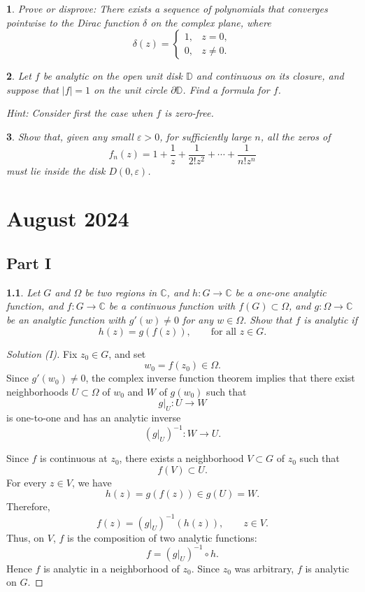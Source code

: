 \documentclass[12pt, a4paper]{report}
\theoremstyle{spaced}
\newtheorem{exercise}{}
\begin{document}
\begin{exercise}
	Prove or disprove: There exists a sequence of polynomials that converges
	pointwise to the Dirac function \(\delta\) on the complex plane, where
	\[
		\delta(z)=
		\begin{cases}
			1, & z=0,     \\
			0, & z\neq 0.
		\end{cases}
	\]
\end{exercise}

\begin{exercise}
	Let \(f\) be analytic on the open unit disk \(\mathbb{D}\) and continuous on
	its closure, and suppose that \(|f|=1\) on the unit circle
	\(\partial\mathbb{D}\). Find a formula for \(f\).

	\emph{Hint:} Consider first the case when \(f\) is zero-free.
\end{exercise}

\begin{exercise}
	Show that, given any small \(\varepsilon>0\), for sufficiently large \(n\),
	all the zeros of
	\[
		f_n(z)
		=
		1+\frac{1}{z}+\frac{1}{2!z^2}+\cdots+\frac{1}{n!z^n}
	\]
	must lie inside the disk \(D(0,\varepsilon)\).
\end{exercise}

\chapter{August 2024}

\section{Part I}
\begin{exercise}
	Let \(G\) and \(\Omega\) be two regions in \(\mathbb{C}\), and
	\(h:G\to\mathbb{C}\) be a one-one analytic function, and
	\(f:G\to\mathbb{C}\) be a continuous function with \(f(G)\subset\Omega\), and
	\(g:\Omega\to\mathbb{C}\) be an analytic function with \(g'(w)\neq 0\) for any
	\(w\in\Omega\). Show that \(f\) is analytic if
	\[
		h(z)=g(f(z)), \qquad \text{for all } z\in G.
	\]
\end{exercise}
\begin{proof}[Solution (I)]
	Fix \(z_0\in G\), and set
	\[
		w_0=f(z_0)\in\Omega.
	\]
	Since \(g'(w_0)\neq 0\), the complex inverse function theorem implies that
	there exist neighborhoods \(U\subset\Omega\) of \(w_0\) and \(W\) of
	\(g(w_0)\) such that
	\[
		g|_U:U\longrightarrow W
	\]
	is one-to-one and has an analytic inverse
	\[
		(g|_U)^{-1}:W\longrightarrow U.
	\]

	Since \(f\) is continuous at \(z_0\), there exists a neighborhood
	\(V\subset G\) of \(z_0\) such that
	\[
		f(V)\subset U.
	\]
	For every \(z\in V\), we have
	\[
		h(z)=g(f(z))\in g(U)=W.
	\]
	Therefore,
	\[
		f(z)=(g|_U)^{-1}(h(z)),\qquad z\in V.
	\]
	Thus, on \(V\), \(f\) is the composition of two analytic functions:
	\[
		f=(g|_U)^{-1}\circ h.
	\]
	Hence \(f\) is analytic in a neighborhood of \(z_0\). Since \(z_0\) was
	arbitrary, \(f\) is analytic on \(G\).
\end{proof}
\end{document}
